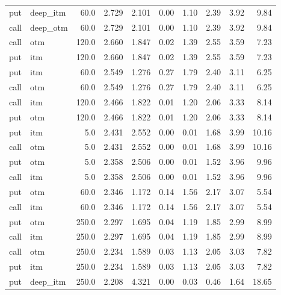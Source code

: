 \begin{longtable}{llrrrrrrrr}
  put &  deep\_itm &      60.0 &  2.729 &  2.101 &    0.00 &    1.10 &   2.39 &    3.92 &    9.84 \\
 call &  deep\_otm &      60.0 &  2.729 &  2.101 &    0.00 &    1.10 &   2.39 &    3.92 &    9.84 \\
 call &       otm &     120.0 &  2.660 &  1.847 &    0.02 &    1.39 &   2.55 &    3.59 &    7.23 \\
  put &       itm &     120.0 &  2.660 &  1.847 &    0.02 &    1.39 &   2.55 &    3.59 &    7.23 \\
  put &       itm &      60.0 &  2.549 &  1.276 &    0.27 &    1.79 &   2.40 &    3.11 &    6.25 \\
 call &       otm &      60.0 &  2.549 &  1.276 &    0.27 &    1.79 &   2.40 &    3.11 &    6.25 \\
 call &       itm &     120.0 &  2.466 &  1.822 &    0.01 &    1.20 &   2.06 &    3.33 &    8.14 \\
  put &       otm &     120.0 &  2.466 &  1.822 &    0.01 &    1.20 &   2.06 &    3.33 &    8.14 \\
  put &       itm &       5.0 &  2.431 &  2.552 &    0.00 &    0.01 &   1.68 &    3.99 &   10.16 \\
 call &       otm &       5.0 &  2.431 &  2.552 &    0.00 &    0.01 &   1.68 &    3.99 &   10.16 \\
  put &       otm &       5.0 &  2.358 &  2.506 &    0.00 &    0.01 &   1.52 &    3.96 &    9.96 \\
 call &       itm &       5.0 &  2.358 &  2.506 &    0.00 &    0.01 &   1.52 &    3.96 &    9.96 \\
  put &       otm &      60.0 &  2.346 &  1.172 &    0.14 &    1.56 &   2.17 &    3.07 &    5.54 \\
 call &       itm &      60.0 &  2.346 &  1.172 &    0.14 &    1.56 &   2.17 &    3.07 &    5.54 \\
  put &       otm &     250.0 &  2.297 &  1.695 &    0.04 &    1.19 &   1.85 &    2.99 &    8.99 \\
 call &       itm &     250.0 &  2.297 &  1.695 &    0.04 &    1.19 &   1.85 &    2.99 &    8.99 \\
 call &       otm &     250.0 &  2.234 &  1.589 &    0.03 &    1.13 &   2.05 &    3.03 &    7.82 \\
  put &       itm &     250.0 &  2.234 &  1.589 &    0.03 &    1.13 &   2.05 &    3.03 &    7.82 \\
  put &  deep\_itm &     250.0 &  2.208 &  4.321 &    0.00 &    0.03 &   0.46 &    1.64 &   18.65 \\

\end{longtable}
